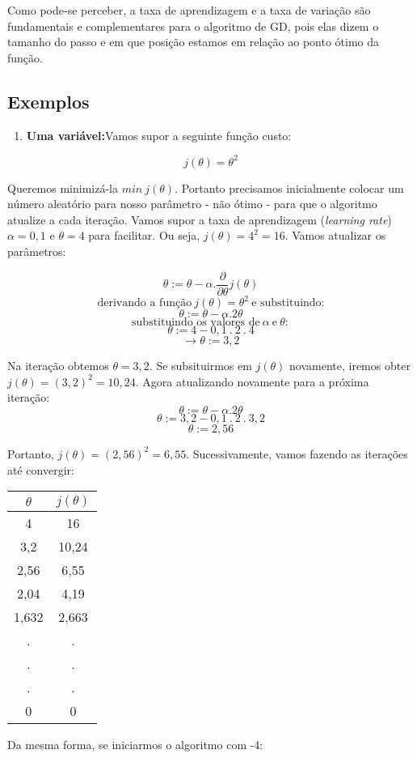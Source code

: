 \documentclass[
  openany]{book}
\providecommand{\tightlist}{%
  \setlength{\itemsep}{0pt}\setlength{\parskip}{0pt}}
\begin{document}
Como pode-se perceber, a taxa de aprendizagem e a taxa de variação são fundamentais e complementares para o algoritmo de GD, pois elas dizem o tamanho do passo e em que posição estamos em relação ao ponto ótimo da função.

\hypertarget{exemplos}{%
\subsection{Exemplos}\label{exemplos}}

\begin{enumerate}
\def\labelenumi{\arabic{enumi}.}
\tightlist
\item
  \textbf{Uma variável:}Vamos supor a seguinte função custo:
\end{enumerate}

\[j(\theta)=\theta^2\]

Queremos minimizá-la \(min \ j(\theta)\). Portanto precisamos inicialmente colocar um número aleatório para nosso parâmetro - não ótimo - para que o algoritmo atualize a cada iteração. Vamos supor a taxa de aprendizagem (\emph{learning rate}) \(\alpha=0,1\) e \(\theta=4\) para facilitar. Ou seja, \(j(\theta)=4^2=16\). Vamos atualizar os parâmetros:

\[\theta := \theta-\alpha.\frac{\partial}{\partial\theta}j(\theta) \]
\[\mbox{derivando a função} \ j(\theta)=\theta^2 \ \mbox{e substituindo:}\]
\[\theta:= \theta -\alpha.2\theta \]
\[\mbox{substituindo os valores de}\ \alpha\ \mbox{e}\ \theta: \]
\[\theta:=4-0,1 \ .\ 2\ .\ 4 \]
\[\rightarrow \theta:=3,2\]

Na iteração obtemos \(\theta=3,2\). Se subsituirmos em \(j(\theta)\) novamente, iremos obter \(j(\theta)=(3,2)^2=10,24\). Agora atualizando novamente para a próxima iteração:
\[\theta:= \theta -\alpha.2\theta \]
\[\theta:=3,2-0,1\ .\ 2\ .\ 3,2\]
\[\theta:= 2,56\]

Portanto, \(j(\theta)=(2,56)^2=6,55\). Sucessivamente, vamos fazendo as iterações até convergir:

\begin{longtable}[]{@{}cc@{}}
\toprule
\textbf{\(\theta\)} & \textbf{\(j(\theta)\)}\tabularnewline
\midrule
\endhead
4 & 16\tabularnewline
3,2 & 10,24\tabularnewline
2,56 & 6,55\tabularnewline
2,04 & 4,19\tabularnewline
1,632 & 2,663\tabularnewline
. & .\tabularnewline
. & .\tabularnewline
. & .\tabularnewline
0 & 0\tabularnewline
\bottomrule
\end{longtable}

Da mesma forma, se iniciarmos o algoritmo com -4:
\end{document}
